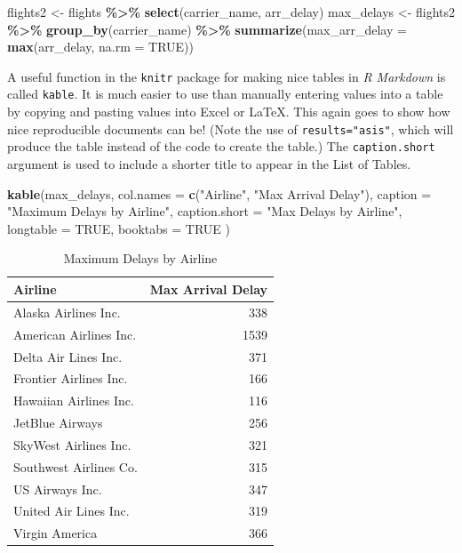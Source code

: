 \documentclass[12pt,twoside]{book}
\newenvironment{Shaded}{\begin{snugshade}}{\end{snugshade}}
\newcommand{\AttributeTok}[1]{\textcolor[rgb]{0.13,0.29,0.53}{#1}}
\newcommand{\ConstantTok}[1]{\textcolor[rgb]{0.56,0.35,0.01}{#1}}
\newcommand{\FunctionTok}[1]{\textcolor[rgb]{0.13,0.29,0.53}{\textbf{#1}}}
\newcommand{\NormalTok}[1]{#1}
\newcommand{\OtherTok}[1]{\textcolor[rgb]{0.56,0.35,0.01}{#1}}
\newcommand{\SpecialCharTok}[1]{\textcolor[rgb]{0.81,0.36,0.00}{\textbf{#1}}}
\newcommand{\StringTok}[1]{\textcolor[rgb]{0.31,0.60,0.02}{#1}}
\begin{document}
\begin{Shaded}
\begin{Highlighting}[]
\NormalTok{flights2 }\OtherTok{\textless{}{-}}\NormalTok{ flights }\SpecialCharTok{\%\textgreater{}\%}
  \FunctionTok{select}\NormalTok{(carrier\_name, arr\_delay)}
\NormalTok{max\_delays }\OtherTok{\textless{}{-}}\NormalTok{ flights2 }\SpecialCharTok{\%\textgreater{}\%}
  \FunctionTok{group\_by}\NormalTok{(carrier\_name) }\SpecialCharTok{\%\textgreater{}\%}
  \FunctionTok{summarize}\NormalTok{(}\AttributeTok{max\_arr\_delay =} \FunctionTok{max}\NormalTok{(arr\_delay, }\AttributeTok{na.rm =} \ConstantTok{TRUE}\NormalTok{))}
\end{Highlighting}
\end{Shaded}

A useful function in the \texttt{knitr} package for making nice tables in \emph{R Markdown} is called \texttt{kable}. It is much easier to use than manually entering values into a table by copying and pasting values into Excel or LaTeX. This again goes to show how nice reproducible documents can be! (Note the use of \texttt{results="asis"}, which will produce the table instead of the code to create the table.) The \texttt{caption.short} argument is used to include a shorter title to appear in the List of Tables.

\begin{Shaded}
\begin{Highlighting}[]
\FunctionTok{kable}\NormalTok{(max\_delays,}
  \AttributeTok{col.names =} \FunctionTok{c}\NormalTok{(}\StringTok{"Airline"}\NormalTok{, }\StringTok{"Max Arrival Delay"}\NormalTok{),}
  \AttributeTok{caption =} \StringTok{"Maximum Delays by Airline"}\NormalTok{,}
  \AttributeTok{caption.short =} \StringTok{"Max Delays by Airline"}\NormalTok{,}
  \AttributeTok{longtable =} \ConstantTok{TRUE}\NormalTok{,}
  \AttributeTok{booktabs =} \ConstantTok{TRUE}
\NormalTok{)}
\end{Highlighting}
\end{Shaded}

\begin{longtable}[t]{lr}
\caption[Max Delays by Airline]{\label{tab:maxdelays}Maximum Delays by Airline}\\
\toprule
Airline & Max Arrival Delay\\
\midrule
Alaska Airlines Inc. & 338\\
American Airlines Inc. & 1539\\
Delta Air Lines Inc. & 371\\
Frontier Airlines Inc. & 166\\
Hawaiian Airlines Inc. & 116\\
\addlinespace
JetBlue Airways & 256\\
SkyWest Airlines Inc. & 321\\
Southwest Airlines Co. & 315\\
US Airways Inc. & 347\\
United Air Lines Inc. & 319\\
\addlinespace
Virgin America & 366\\
\bottomrule
\end{longtable}
\end{document}
